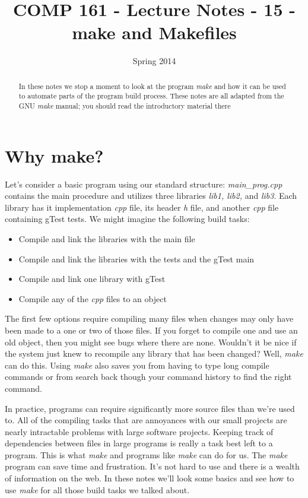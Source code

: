 \documentclass[]{tufte-handout}
\title{COMP 161 - Lecture Notes - 15 - make and Makefiles}
\date{Spring 2014}
\begin{document}
 
\maketitle

\begin{abstract}
In these notes we stop a moment to look at the program \textit{make} and how it can be used to automate parts of the program build process. These notes are all adapted from the GNU \textit{make} manual; you should read the introductory material there
\end{abstract}

\section{Why make?}

Let's consider a basic program using our standard structure: \textit{main\_prog.cpp} contains the main procedure and utilizes three libraries \textit{lib1, lib2,} and \textit{lib3}. Each library has it implementation \textit{cpp} file, its header \textit{h} file, and another \textit{cpp} file containing gTest tests.  We might imagine the following build tasks:
\begin{itemize}
\item Compile and link the libraries with the main file
\item Compile and link the libraries with the tests and the gTest main 
\item Compile and link one library with gTest
\item Compile any of the \textit{cpp} files to an object
\end{itemize}
The first few options require compiling many files when changes may only have been made to a one or two of those files.  If you forget to compile one and use an old object, then you might see bugs where there are none. Wouldn't it be nice if the system just knew to recompile any library that has been changed? Well, \textit{make} can do this.  Using \textit{make} also saves you from having to type long compile commands or from search back though your command history to find the right command.  

In practice, programs can require significantly more source files than we're used to.  All of the compiling tasks that are annoyances with our small projects are nearly intractable problems with large software projects. Keeping track of dependencies between files in large programs is really a task best left to a program.  This is what \textit{make} and programs like \textit{make} can do for us. The \textit{make} program can save time and frustration.  It's not hard to use and there is a wealth of information on the web.  In these notes we'll look some basics and see how to use \textit{make} for all those build tasks we talked about. 
\end{document}
